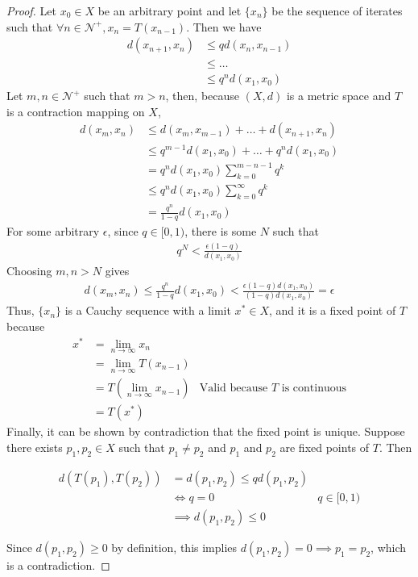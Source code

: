 \documentclass{article}
\begin{document}
\begin{proof}
Let $x_0 \in X$ be an arbitrary point and let $\{x_n\}$ be the sequence of iterates such that $\forall n \in \mathcal{N}^+, x_n = T(x_{n-1})$. Then we have
\begin{align*}
    d(x_{n+1}, x_n) &\leq q d(x_n, x_{n-1})\\
    &\leq \ldots\\
    &\leq q^n d(x_1, x_0)
\end{align*}
Let $m, n \in \mathcal{N}^+$ such that $m > n$, then, because $(X, d)$ is a metric space and $T$ is a contraction mapping on $X$,
\begin{align*}
    d(x_m, x_n) &\leq d(x_m, x_{m-1}) + \ldots + d(x_{n+1}, x_n)\\
    &\leq q^{m-1}d(x_1, x_0) + \ldots + q^{n}d(x_1, x_0)\\
    &= q^n d(x_1, x_0) \sum_{k=0}^{m-n-1}q^k\\
    &\leq q^n d(x_1, x_0) \sum_{k=0}^{\infty}q^k\\
    &= \frac{q^n}{1 - q} d(x_1, x_0)
\end{align*}
For some arbitrary $\epsilon$, since $q \in [0, 1)$, there is some $N$ such that
\begin{align*}
    q^N < \frac{\epsilon (1-q)}{d(x_1, x_0)}
\end{align*}
Choosing $m, n > N$ gives
\begin{align*}
    d(x_m, x_n) \leq \frac{q^n}{1 - q} d(x_1, x_0) < \frac{\epsilon (1 - q) d(x_1, x_0)}{(1 - q) d(x_1, x_0)} = \epsilon
\end{align*}
Thus, $\{x_n\}$ is a Cauchy sequence with a limit $x^* \in X$, and it is a fixed point of $T$ because
\begin{align*}
    x^* &= \lim_{n\to\infty} x_n\\
    &= \lim_{n\to\infty} T(x_{n-1})\\
    &= T(\lim_{n\to\infty} x_{n-1}) &\text{Valid because $T$ is continuous}\\
    &= T(x^*)
\end{align*}
Finally, it can be shown by contradiction that the fixed point is unique. Suppose there exists $p_1, p_2 \in X$ such that $p_1 \ne p_2$ and $p_1$ and $p_2$ are fixed points of $T$. Then

\begin{align*}
d(T(p_1), T(p_2)) &= d(p_1, p_2) \leq qd(p_1, p_2)\\
&\iff q = 0 &\text{$q \in [0, 1)$}\\
&\implies d(p_1, p_2) \leq 0 
\end{align*}

Since $d(p_1, p_2) \geq 0$ by definition, this implies $d(p_1, p_2) = 0 \implies p_1 = p_2$, which is a contradiction. \qedhere
\end{proof}
\end{document}
